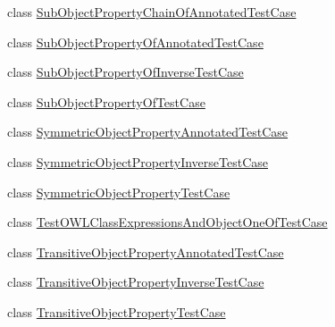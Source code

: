 \begin{DoxyCompactItemize}
\item 
class \hyperlink{classorg_1_1semanticweb_1_1owlapi_1_1api_1_1test_1_1objectproperties_1_1_sub_object_property_chain_of_annotated_test_case}{Sub\-Object\-Property\-Chain\-Of\-Annotated\-Test\-Case}
\item 
class \hyperlink{classorg_1_1semanticweb_1_1owlapi_1_1api_1_1test_1_1objectproperties_1_1_sub_object_property_of_annotated_test_case}{Sub\-Object\-Property\-Of\-Annotated\-Test\-Case}
\item 
class \hyperlink{classorg_1_1semanticweb_1_1owlapi_1_1api_1_1test_1_1objectproperties_1_1_sub_object_property_of_inverse_test_case}{Sub\-Object\-Property\-Of\-Inverse\-Test\-Case}
\item 
class \hyperlink{classorg_1_1semanticweb_1_1owlapi_1_1api_1_1test_1_1objectproperties_1_1_sub_object_property_of_test_case}{Sub\-Object\-Property\-Of\-Test\-Case}
\item 
class \hyperlink{classorg_1_1semanticweb_1_1owlapi_1_1api_1_1test_1_1objectproperties_1_1_symmetric_object_property_annotated_test_case}{Symmetric\-Object\-Property\-Annotated\-Test\-Case}
\item 
class \hyperlink{classorg_1_1semanticweb_1_1owlapi_1_1api_1_1test_1_1objectproperties_1_1_symmetric_object_property_inverse_test_case}{Symmetric\-Object\-Property\-Inverse\-Test\-Case}
\item 
class \hyperlink{classorg_1_1semanticweb_1_1owlapi_1_1api_1_1test_1_1objectproperties_1_1_symmetric_object_property_test_case}{Symmetric\-Object\-Property\-Test\-Case}
\item 
class \hyperlink{classorg_1_1semanticweb_1_1owlapi_1_1api_1_1test_1_1objectproperties_1_1_test_o_w_l_class_expres4ab5c7153399470ac56367ffe6f654bb}{Test\-O\-W\-L\-Class\-Expressions\-And\-Object\-One\-Of\-Test\-Case}
\item 
class \hyperlink{classorg_1_1semanticweb_1_1owlapi_1_1api_1_1test_1_1objectproperties_1_1_transitive_object_property_annotated_test_case}{Transitive\-Object\-Property\-Annotated\-Test\-Case}
\item 
class \hyperlink{classorg_1_1semanticweb_1_1owlapi_1_1api_1_1test_1_1objectproperties_1_1_transitive_object_property_inverse_test_case}{Transitive\-Object\-Property\-Inverse\-Test\-Case}
\item 
class \hyperlink{classorg_1_1semanticweb_1_1owlapi_1_1api_1_1test_1_1objectproperties_1_1_transitive_object_property_test_case}{Transitive\-Object\-Property\-Test\-Case}
\end{DoxyCompactItemize}
